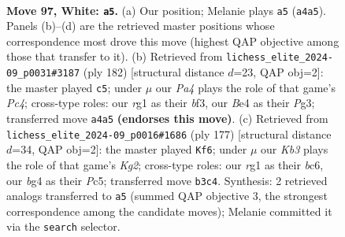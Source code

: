 \documentclass[11pt]{article}
\begin{document}
\clearpage

\begin{figure}[p]\centering
\begin{subfigure}{0.46\textwidth}\centering
\resizebox{\linewidth}{!}{%
\newchessgame
\chessboard[
  setfen={1B3k2/8/1P5R/3N4/P3B1b1/1K5p/8/6r1 w - - 15 97},
  showmover=false,
  pgfstyle=straightmove, color=movearrow, markmove={a4-a5}
]}
\caption{}
\end{subfigure}\hfill
\begin{subfigure}{0.46\textwidth}\centering
\resizebox{\linewidth}{!}{%
\newchessgame
\chessboard[
  setfen={5k2/2R5/4r3/7p/2P4B/3K1bP1/8/8 w - - 73 92},
  showmover=false,
  pgfstyle=straightmove, color=movearrow, markmove={c4-c5}
]}
\caption{}
\end{subfigure}
\\[4pt]
\begin{subfigure}{0.46\textwidth}\centering
\resizebox{\linewidth}{!}{%
\newchessgame
\chessboard[
  setfen={8/6kp/2B5/2p2b2/1pP2P2/r7/3K4/8 b - - 5 89},
  showmover=false,
  pgfstyle=straightmove, color=movearrow, markmove={g7-f6}
]}
\caption{}
\end{subfigure}\hfill

\caption{\textbf{Move 97, White: \texttt{a5}.} (a) Our position; Melanie plays \texttt{a5} (\texttt{a4a5}). Panels (b)--(d) are the retrieved master positions whose correspondence most drove this move (highest QAP objective among those that transfer to it). (b) Retrieved from \texttt{lichess\_elite\_2024-09\_p0031\#3187} (ply 182) [structural distance $d$=23, QAP obj=2]: the master played \texttt{c5}; under $\mu$ our \emph{Pa4} plays the role of that game's \emph{Pc4}; cross-type roles: our \emph{r}g1 as their \emph{b}f3, our \emph{B}e4 as their \emph{P}g3; transferred move \texttt{a4a5} \textbf{(endorses this move)}. (c) Retrieved from \texttt{lichess\_elite\_2024-09\_p0016\#1686} (ply 177) [structural distance $d$=34, QAP obj=2]: the master played \texttt{Kf6}; under $\mu$ our \emph{Kb3} plays the role of that game's \emph{Kg2}; cross-type roles: our \emph{r}g1 as their \emph{b}c6, our \emph{b}g4 as their \emph{P}c5; transferred move \texttt{b3c4}. Synthesis: 2 retrieved analogs transferred to \texttt{a5} (summed QAP objective 3, the strongest correspondence among the candidate moves); Melanie committed it via the \texttt{search} selector.}
\label{fig:thought-m192}
\end{figure}

\clearpage
\end{document}
